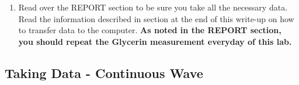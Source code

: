 \documentclass{../lab}
\begin{document}
\begin{enumerate}
    Move the NMR HEAD around gently in the gap until you have maximized the number of ``wiggles'' and minimized the line width. This will place the head in the most uniform or homogeneous region of the magnet, and you want to keep it there. Once you have set the position for the day, don't change it. Some of your calculations depend on the field being the same for successive measurements. Repeat this procedure each day when you first come to the lab, since other people may have moved the NMR head from where you have determined to be the best.

    \item Read over the REPORT section to be sure you take all the necessary data. Read the information described in section at the end of this write-up on how to transfer data to the computer. \textbf{As noted in the REPORT section, you should repeat the Glycerin measurement everyday of this lab.}
\end{enumerate}




\subsection{Taking Data - Continuous Wave}
\end{document}
